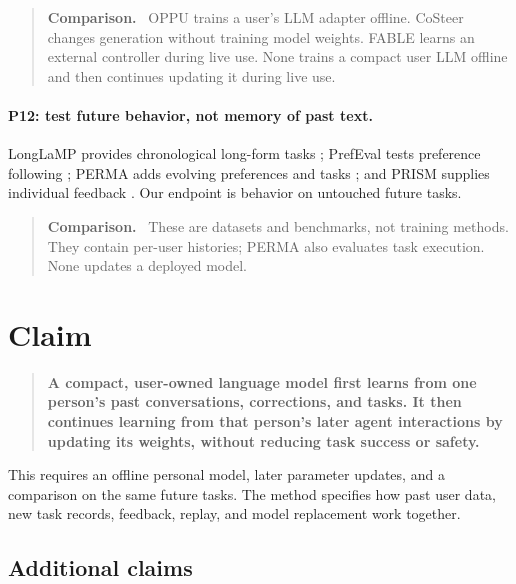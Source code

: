 \documentclass[11pt]{article}
\newenvironment{settingpointer}
  {\begin{quote}\small\noindent\textbf{Comparison.}\ }
  {\end{quote}}
\begin{document}
\begin{settingpointer}
OPPU trains a user's LLM adapter offline.  CoSteer changes generation without
training model weights.  FABLE learns an external controller during live use.
None trains a compact user LLM offline and then continues updating it during
live use.
\end{settingpointer}

\paragraph{P12: test future behavior, not memory of past text.}
LongLaMP provides chronological long-form tasks \citep{kumar2024longlamp};
PrefEval tests preference following \citep{zhao2025prefeval}; PERMA adds
evolving preferences and tasks \citep{liu2026perma}; and PRISM supplies
individual feedback \citep{kirk2024prism}.  Our endpoint is behavior on
untouched future tasks.

\begin{settingpointer}
These are datasets and benchmarks, not training methods.  They contain
per-user histories; PERMA also evaluates task execution.  None updates a
deployed model.
\end{settingpointer}

\section{Claim}
\label{sec:claim}

\begin{quote}
\textbf{A compact, user-owned language model first learns from one person's
past conversations, corrections, and tasks.  It then continues learning from
that person's later agent interactions by updating its weights, without
reducing task success or safety.}
\end{quote}

This requires an offline personal model, later parameter updates, and a
comparison on the same future tasks.  The method specifies how past user data,
new task records, feedback, replay, and model replacement work together.

\subsection{Additional claims}
\end{document}
